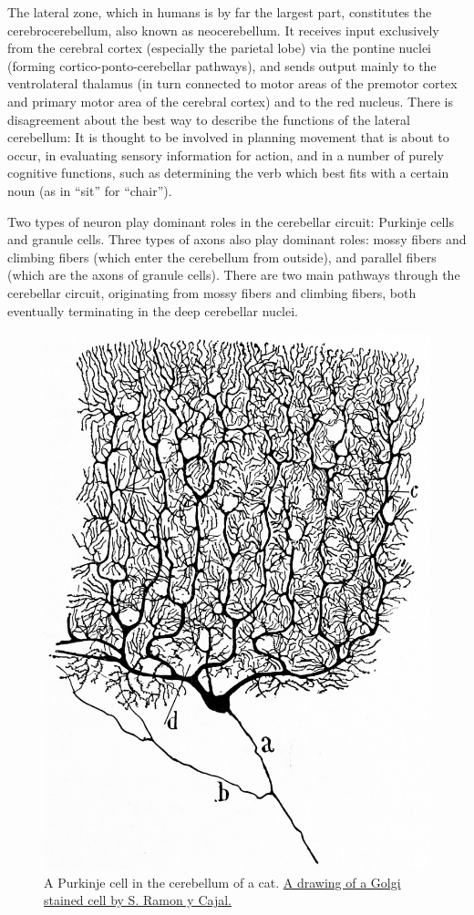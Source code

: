 The lateral zone, which in humans is by far the largest part, constitutes the cerebrocerebellum, also known as neocerebellum. It receives input exclusively from the cerebral cortex (especially the parietal lobe) via the pontine nuclei (forming cortico-ponto-cerebellar pathways), and sends output mainly to the ventrolateral thalamus (in turn connected to motor areas of the premotor cortex and primary motor area of the cerebral cortex) and to the red nucleus. There is disagreement about the best way to describe the functions of the lateral cerebellum: It is thought to be involved in planning movement that is about to occur, in evaluating sensory information for action, and in a number of purely cognitive functions, such as determining the verb which best fits with a certain noun (as in ``sit'' for ``chair'').

Two types of neuron play dominant roles in the cerebellar circuit: Purkinje cells and granule cells. Three types of axons also play dominant roles: mossy fibers and climbing fibers (which enter the cerebellum from outside), and parallel fibers (which are the axons of granule cells). There are two main pathways through the cerebellar circuit, originating from mossy fibers and climbing fibers, both eventually terminating in the deep cerebellar nuclei.



\begin{figure}

{\centering \includegraphics[width=0.7\linewidth]{./figures/cns/purkinje_cell} 

}

\caption{A Purkinje cell in the cerebellum of a cat. \href{https://commons.wikimedia.org/wiki/File:Purkinje_cell_by_Cajal.png}{A drawing of a Golgi stained cell by S. Ramon y Cajal.}}\label{fig:purkinjecell}
\end{figure}

